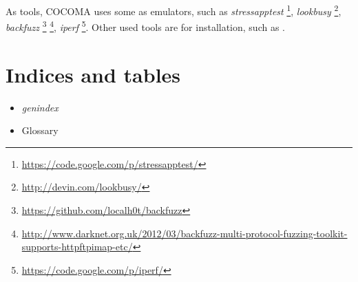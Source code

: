 \documentclass[letterpaper,10pt,english]{sphinxhowto}
\begin{document}
As tools, COCOMA uses some as emulators, such as \emph{stressapptest} \footnote{
\href{https://code.google.com/p/stressapptest/}{https://code.google.com/p/stressapptest/}
}, \emph{lookbusy} \footnote{
\href{http://devin.com/lookbusy/}{http://devin.com/lookbusy/}
}, \emph{backfuzz} \footnote{
\href{https://github.com/localh0t/backfuzz}{https://github.com/localh0t/backfuzz}
} \footnote{
\href{http://www.darknet.org.uk/2012/03/backfuzz-multi-protocol-fuzzing-toolkit-supports-httpftpimap-etc/}{http://www.darknet.org.uk/2012/03/backfuzz-multi-protocol-fuzzing-toolkit-supports-httpftpimap-etc/}
}, \emph{iperf} \footnote{
\href{https://code.google.com/p/iperf/}{https://code.google.com/p/iperf/}
}. Other used tools are for installation, such as .


\section{Indices and tables}
\label{index:indices-and-tables}\begin{itemize}
\item {} 
\emph{genindex}

\end{itemize}
\begin{itemize}
\item {} 
Glossary

\end{itemize}



\renewcommand{\indexname}{Index}
\printindex
\end{document}
